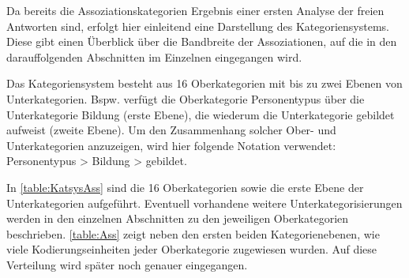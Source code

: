 Da bereits die Assoziationskategorien Ergebnis einer ersten Analyse der freien Antworten sind, erfolgt hier einleitend eine Darstellung des Kategoriensystems. 
Diese gibt einen Überblick über die Bandbreite der Assoziationen, auf die in den darauffolgenden Abschnitten im Einzelnen eingegangen wird. 

Das Kategoriensystem besteht aus 16 Oberkategorien mit bis zu zwei Ebenen von Unterkategorien. 
Bspw. verfügt die Oberkategorie \glqq Personentypus\grqq{} über die Unterkategorie \glqq Bildung\grqq{} (erste Ebene), die wiederum die Unterkategorie \glqq gebildet\grqq{} aufweist (zweite Ebene). 
Um den Zusammenhang solcher Ober- und Unterkategorien anzuzeigen, wird hier folgende Notation verwendet: \glqq Personentypus > Bildung > gebildet\grqq.

In \autoref{table:KatsysAss} sind die 16 Oberkategorien sowie die erste Ebene der Unterkategorien aufgeführt. 
Eventuell vorhandene weitere Unterkategorisierungen werden in den einzelnen Abschnitten zu den jeweiligen Oberkategorien beschrieben.
\autoref{table:Ass} zeigt neben den ersten beiden Kategorienebenen, wie viele Kodierungseinheiten jeder Oberkategorie zugewiesen wurden. 
Auf diese Verteilung wird später noch genauer eingegangen. 

